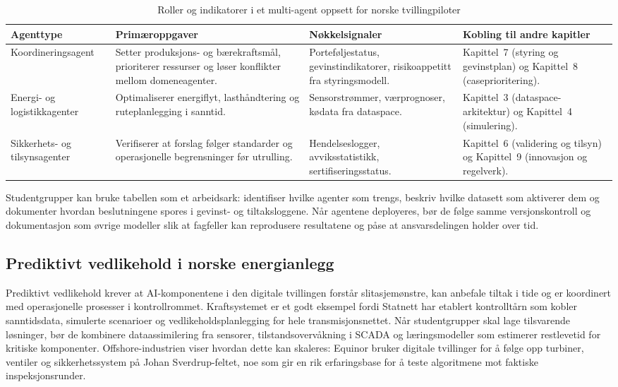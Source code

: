 \begin{table}[htbp]
    \centering
    \caption{Roller og indikatorer i et multi-agent oppsett for norske tvillingpiloter}
    \label{tab:multiagent-roller}
    \begin{tabular}{p{3.4cm}p{4.2cm}p{3.6cm}p{3.8cm}}
        \toprule
        \textbf{Agenttype} & \textbf{Primæroppgaver} & \textbf{Nøkkelsignaler} & \textbf{Kobling til andre kapitler} \\
        \midrule
        Koordineringsagent & Setter produksjons- og bærekraftsmål, prioriterer ressurser og løser konflikter mellom domeneagenter. & Porteføljestatus, gevinstindikatorer, risikoappetitt fra styringsmodell. & Kapittel~7 (styring og gevinstplan) og Kapittel~8 (caseprioritering). \\
        \addlinespace
        Energi- og logistikkagenter & Optimaliserer energiflyt, lasthåndtering og ruteplanlegging i sanntid. & Sensorstrømmer, værprognoser, kødata fra dataspace. & Kapittel~3 (dataspace-arkitektur) og Kapittel~4 (simulering). \\
        \addlinespace
        Sikkerhets- og tilsynsagenter & Verifiserer at forslag følger standarder og operasjonelle begrensninger før utrulling. & Hendelseslogger, avviksstatistikk, sertifiseringsstatus. & Kapittel~6 (validering og tilsyn) og Kapittel~9 (innovasjon og regelverk). \\
        \bottomrule
    \end{tabular}
\end{table}

Studentgrupper kan bruke tabellen som et arbeidsark: identifiser hvilke agenter som trengs, beskriv hvilke datasett som aktiverer dem og dokumenter hvordan beslutningene spores i gevinst- og tiltaksloggene. Når agentene deployeres, bør de følge samme versjonskontroll og dokumentasjon som øvrige modeller slik at fagfeller kan reprodusere resultatene og påse at ansvarsdelingen holder over tid.

\subsection{Prediktivt vedlikehold i norske energianlegg}
Prediktivt vedlikehold krever at AI-komponentene i den digitale tvillingen forstår slitasjemønstre, kan anbefale tiltak i tide og er koordinert med operasjonelle prosesser i kontrollrommet. Kraftsystemet er et godt eksempel fordi Statnett har etablert kontrolltårn som kobler sanntidsdata, simulerte scenarioer og vedlikeholdsplanlegging for hele transmisjonsnettet.\citep{statnett2024kontrolltarn} Når studentgrupper skal lage tilsvarende løsninger, bør de kombinere dataassimilering fra sensorer, tilstandsovervåkning i SCADA og læringsmodeller som estimerer restlevetid for kritiske komponenter. Offshore-industrien viser hvordan dette kan skaleres: Equinor bruker digitale tvillinger for å følge opp turbiner, ventiler og sikkerhetssystem på Johan Sverdrup-feltet, noe som gir en rik erfaringsbase for å teste algoritmene mot faktiske inspeksjonsrunder.\citep{equinor2021johansverdrup}


